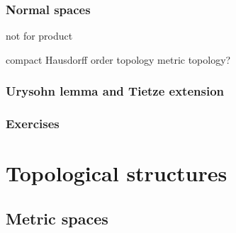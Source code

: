 \documentclass{../../large}
\begin{document}
\section{Normal spaces}
not for product

compact Hausdorff
order topology
metric topology?

\section{Urysohn lemma and Tietze extension}



\section*{Exercises}
\begin{prb}
\end{prb}
\begin{prb}
\end{prb}
\begin{prb}
\end{prb}
\begin{prb}
\end{prb}
\begin{prb}
\end{prb}



\part{Topological structures}

\chapter{Metric spaces}
\end{document}

